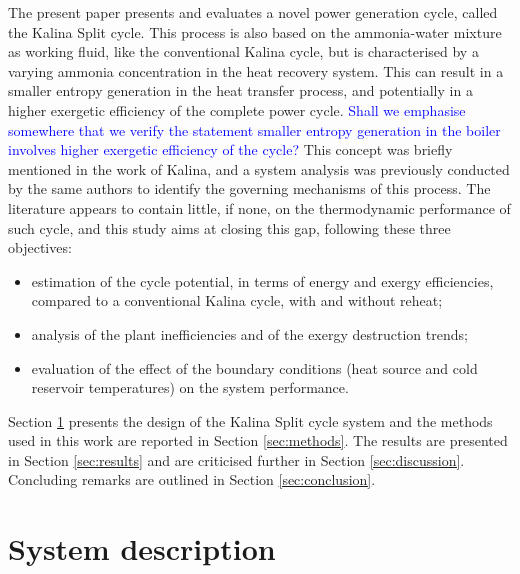 \documentclass[final,times,3p]{elsarticle}
\begin{document}
The present paper presents and evaluates a novel power generation cycle, called the Kalina Split cycle. This process is also based on the ammonia-water mixture as working fluid, like the conventional Kalina cycle, but is characterised by a varying ammonia concentration in the heat recovery system. This can result in a smaller entropy generation in the heat transfer process, and potentially in a higher exergetic efficiency of the complete power cycle. \textcolor{blue}{Shall we emphasise somewhere that we verify the statement smaller entropy generation in the boiler involves higher exergetic efficiency of the cycle?} This concept was briefly mentioned in the work of Kalina, and a system analysis was previously conducted by the same authors to identify the governing mechanisms of this process. The literature appears to contain little, if none, on the thermodynamic performance of such cycle, and this study aims at closing this gap, following these three objectives:

\begin{itemize}

	\item estimation of the cycle potential, in terms of energy and exergy efficiencies, compared to a conventional Kalina cycle, with and without reheat;
	\item analysis of the plant inefficiencies and of the exergy destruction trends;
	\item evaluation of the effect of the boundary conditions (heat source and cold reservoir temperatures) on the system performance.

\end{itemize}

Section \ref{sec:system_description} presents the design of the Kalina Split cycle system and the methods used in this work are reported in Section \ref{sec:methods}. The results are presented in Section \ref{sec:results} and are criticised further in Section \ref{sec:discussion}. Concluding remarks are outlined in Section \ref{sec:conclusion}.



\section{System description}
\label{sec:system_description} 
\end{document}
